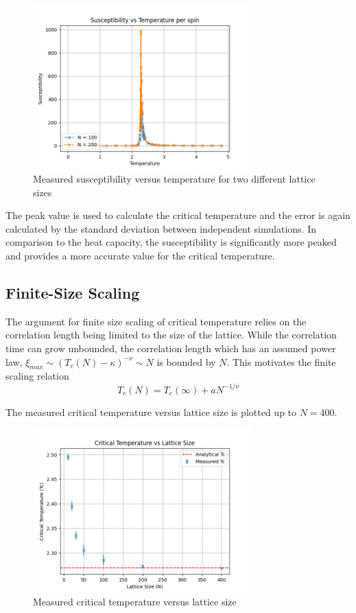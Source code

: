 \documentclass[a4paper, 12pt]{article}
\begin{document}
\begin{figure}[H]
\centering
\includegraphics[width=0.75\textwidth]{./resources/susceptibility.png}
\caption{Measured susceptibility versus temperature for two different lattice sizes}
\end{figure}

The peak value is used to calculate the critical temperature and the error is again calculated by the standard deviation between independent simulations. In comparison to the heat capacity, the susceptibility is significantly more peaked and provides a more accurate value for the critical temperature.


\subsection{Finite-Size Scaling}
The argument for finite size scaling of critical temperature relies on the correlation length being limited to the size of the lattice. While the correlation time can grow unbounded, the correlation length which has an assumed power law, \( \xi_{max} \sim (T_c(N) - \kappa)^{-\nu} \sim N \) is bounded by \( N \). This motivates the finite scaling relation
\[ T_c(N) = T_c(\infty) + a N^{-1/\nu} \]

The measured critical temperature versus lattice size is plotted up to \( N = 400 \).

\begin{figure}[H]
\centering
\includegraphics[width=0.75\textwidth]{./resources/finite_size_scaling.png}
\caption{Measured critical temperature versus lattice size}
\end{figure}
\end{document}
